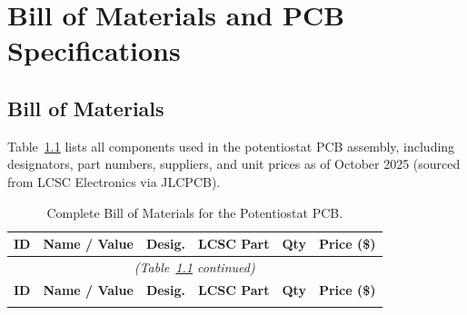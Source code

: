 \chapter{Bill of Materials and PCB Specifications}
\label{app:bom}

\section{Bill of Materials}

Table~\ref{tab:bom_full} lists all components used in the potentiostat PCB assembly, including designators, part numbers, suppliers, and unit prices as of October 2025 (sourced from LCSC Electronics via JLCPCB).

\begin{longtable}{@{}p{0.4cm}p{3.2cm}p{1.8cm}p{2.6cm}p{1.0cm}p{1.0cm}@{}}
\caption{Complete Bill of Materials for the Potentiostat PCB.}
\label{tab:bom_full}\\
\toprule
\textbf{ID} & \textbf{Name / Value} & \textbf{Desig.} & \textbf{LCSC Part} & \textbf{Qty} & \textbf{Price (\$)} \\
\midrule
\endfirsthead
\multicolumn{6}{c}{\textit{(Table~\ref{tab:bom_full} continued)}}\\
\toprule
\textbf{ID} & \textbf{Name / Value} & \textbf{Desig.} & \textbf{LCSC Part} & \textbf{Qty} & \textbf{Price (\$)} \\
\midrule
\endhead
\bottomrule
\endfoot


\end{longtable}
